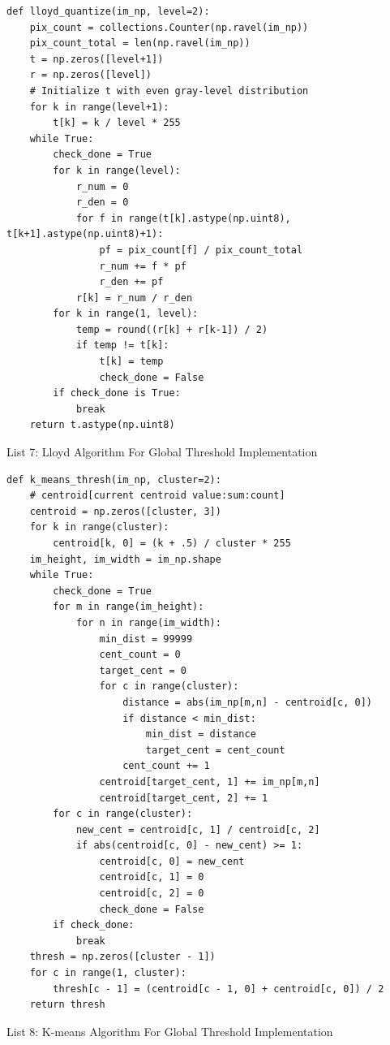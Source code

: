 \documentclass[titlepage]{article}
\begin{document}
\begin{listing}
\begin{verbatim}
def lloyd_quantize(im_np, level=2):
    pix_count = collections.Counter(np.ravel(im_np))
    pix_count_total = len(np.ravel(im_np))
    t = np.zeros([level+1])
    r = np.zeros([level])
    # Initialize t with even gray-level distribution
    for k in range(level+1):
        t[k] = k / level * 255
    while True:
        check_done = True
        for k in range(level):
            r_num = 0
            r_den = 0
            for f in range(t[k].astype(np.uint8), t[k+1].astype(np.uint8)+1):
                pf = pix_count[f] / pix_count_total
                r_num += f * pf
                r_den += pf
            r[k] = r_num / r_den
        for k in range(1, level):
            temp = round((r[k] + r[k-1]) / 2)
            if temp != t[k]:
                t[k] = temp
                check_done = False
        if check_done is True:
            break
    return t.astype(np.uint8)
\end{verbatim}
\centering
\caption{List 7: Lloyd Algorithm For Global Threshold Implementation}
\newline
\end{listing}

\begin{listing}
\begin{verbatim}
def k_means_thresh(im_np, cluster=2):
    # centroid[current centroid value:sum:count]
    centroid = np.zeros([cluster, 3])
    for k in range(cluster):
        centroid[k, 0] = (k + .5) / cluster * 255
    im_height, im_width = im_np.shape
    while True:
        check_done = True
        for m in range(im_height):
            for n in range(im_width):
                min_dist = 99999
                cent_count = 0
                target_cent = 0
                for c in range(cluster):
                    distance = abs(im_np[m,n] - centroid[c, 0])
                    if distance < min_dist:
                        min_dist = distance
                        target_cent = cent_count
                    cent_count += 1
                centroid[target_cent, 1] += im_np[m,n]
                centroid[target_cent, 2] += 1
        for c in range(cluster):
            new_cent = centroid[c, 1] / centroid[c, 2]
            if abs(centroid[c, 0] - new_cent) >= 1:
                centroid[c, 0] = new_cent
                centroid[c, 1] = 0
                centroid[c, 2] = 0
                check_done = False
        if check_done:
            break
    thresh = np.zeros([cluster - 1])
    for c in range(1, cluster):
        thresh[c - 1] = (centroid[c - 1, 0] + centroid[c, 0]) / 2
    return thresh
\end{verbatim}
\centering
\caption{List 8: K-means Algorithm For Global Threshold Implementation}
\newline
\end{listing}
\end{document}

